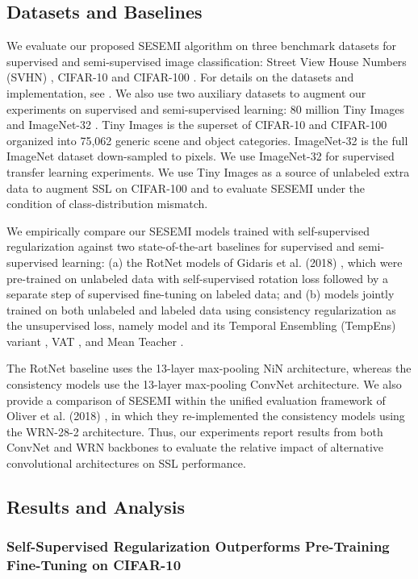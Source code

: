 \documentclass{article}
\begin{document}
\subsection{Datasets and Baselines}
We evaluate our proposed SESEMI algorithm on three benchmark datasets for supervised and semi-supervised image classification: Street View House Numbers (SVHN) \cite{svhn}, CIFAR-10 and CIFAR-100 \cite{cifar}. For details on the datasets and implementation, see . We also use two auxiliary datasets to augment our experiments on supervised and semi-supervised learning: 80 million Tiny Images \cite{tiny-images} and ImageNet-32 \cite{tiny-imagenet}. Tiny Images is the superset of CIFAR-10 and CIFAR-100 organized into 75,062 generic scene and object categories. ImageNet-32 is the full ImageNet dataset \cite{imagenet} down-sampled to  pixels. We use ImageNet-32 for supervised transfer learning experiments. We use Tiny Images as a source of unlabeled extra data to augment SSL on CIFAR-100 and to evaluate SESEMI under the condition of class-distribution mismatch.

We empirically compare our SESEMI models trained with self-supervised regularization against two state-of-the-art baselines for supervised and semi-supervised learning: (a) the RotNet models of Gidaris et al. (2018) \cite{rotations}, which were pre-trained on unlabeled data with self-supervised rotation loss followed by a separate step of supervised fine-tuning on labeled data; and (b) models jointly trained on both unlabeled and labeled data using consistency regularization as the unsupervised loss, namely  model and its Temporal Ensembling (TempEns) variant \cite{tempens}, VAT \cite{vat2}, and Mean Teacher \cite{mean-teacher}.

The RotNet baseline uses the 13-layer max-pooling NiN architecture, whereas the consistency models use the 13-layer max-pooling ConvNet architecture. We also provide a comparison of SESEMI within the unified evaluation framework of Oliver et al. (2018) \cite{ssl-eval}, in which they re-implemented the consistency models using the WRN-28-2 architecture. Thus, our experiments report results from both ConvNet and WRN backbones to evaluate the relative impact of alternative convolutional architectures on SSL performance.

\subsection{Results and Analysis}
\subsubsection{Self-Supervised Regularization Outperforms Pre-Training  Fine-Tuning on CIFAR-10}
\end{document}
